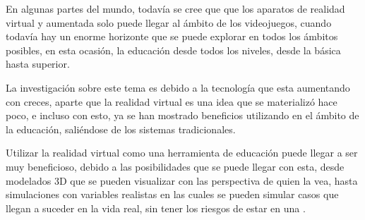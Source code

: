 En algunas partes del mundo, todavía se cree que que los aparatos de realidad virtual y aumentada solo puede llegar al ámbito de los videojuegos, cuando todavía hay un enorme horizonte que se puede explorar en todos los ámbitos posibles, en esta ocasión, la educación desde todos los niveles, desde la básica hasta superior.

La investigación sobre este tema es debido a la tecnología que esta aumentando con creces, aparte que la realidad virtual es  una idea que se materializ\'o hace poco, e incluso con esto, ya se han mostrado beneficios utilizando en el ámbito de la educación, sali\'endose de los sistemas tradicionales.

Utilizar la realidad virtual como una herramienta de educación puede llegar a ser muy beneficioso, debido a las posibilidades que se puede llegar con esta, desde modelados 3D que se pueden visualizar con las perspectiva de quien la vea, hasta simulaciones con variables realistas en las cuales se pueden simular casos que llegan a suceder en la vida real, sin tener los riesgos de estar en una \parencite{chen2020effectiveness}.
